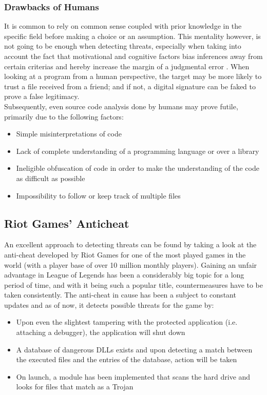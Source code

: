 \subsubsection{Drawbacks of Humans}

It is common to rely on common sense coupled with prior knowledge in the specific field before making a choice or an assumption. This mentality however, is not going to be enough when detecting threats, especially when taking into account the fact that motivational and cognitive factors bias inferences away from certain criterias and hereby increase the margin of a judgmental error \cite{kruglanski1983bias}. When looking at a program from a human perspective, the target may be more likely to trust a file received from a friend; and if not, a digital signature can be faked to prove a false legitimacy. \\

\noindent Subsequently, even source code analysis done by humans may prove futile, primarily due to the following factors:
\begin{itemize}
    \item Simple misinterpretations of code
    \item Lack of complete understanding of a programming language or over a library
    \item Ineligible obfuscation of code in order to make the understanding of the code as difficult as possible
    \item Impossibility to follow or keep track of multiple files
\end{itemize}


\subsection{Riot Games' Anticheat}
An excellent approach to detecting threats can be found by taking a look at the anti-cheat developed by Riot Games for one of the most played games in the world (with a player base of over 10 million monthly players)\cite{ferrari2013generative}. Gaining an unfair advantage in League of Legends has been a considerably big topic for a long period of time, and with it being such a popular title, countermeasures have to be taken consistently. The anti-cheat in cause has been a subject to constant updates and as of now, it detects possible threats for the game by:
\begin{itemize}
    \item Upon even the slightest tampering with the protected application (i.e. attaching a debugger), the application will shut down
    \item A database of dangerous DLLs exists and upon detecting a match between the executed files and the entries of the database, action will be taken
    \item On launch, a module has been implemented that scans the hard drive and looks for files that match as a Trojan
\end{itemize}


